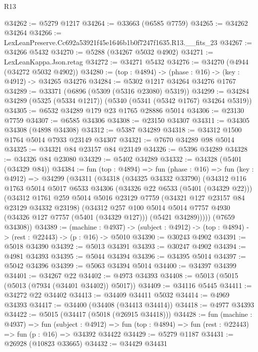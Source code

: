 \begin{lexlean}{R13}
\begin{coremodule}
@34262 := @5279 @1217
@34264 := @33663 (@6585 @7759)
@34265 := @34262 @34264
@34266 := LexLeanPreserve.Cc692a53921f45e1646b1b0f7247f1635.R13.__fits_23
@34267 := @34266 @5432
@34270 := @5288 (@34267 @5032 @4902)
@34271 := LexLeanKappa.Json.retag
@34272 := @34271 @5432
@34276 := @34270 (@4944 (@34272 @5032 @4902))
@34280 := (top : @4894) -> (phase : @16) -> (key : @4912) -> @34265 @34276
@34284 := @5302 @1217 @34264 @34276 @1767
@34289 := @33371 (@6896 (@5309 (@5316 @23080) @5319))
@34299 := @34284 @34289 (@5325 (@5334 @1217)) (@5340 (@5341 (@5342 @1767) @34264 @5319))
@34305 := @6532 @34289 @179 @23 @1765 @28886 @5014
@34306 := @23130 @7759
@34307 := @6585 @34306
@34308 := @23150 @34307
@34311 := @34305 @34308 (@4898 @34308)
@34312 := @5387 @34289
@34318 := @34312 @1500 @1764 @5014 @7933 @23149 @34307
@34321 := @7670 @34289 @98 @5014
@34325 := @34321 @84 @23157 @84 @23149
@34326 := @5396 @34289
@34328 := @34326 @84 @23080
@34329 := @5402 @34289
@34332 := @34328 (@5401 (@34329 @84))
@34384 := fun (top : @4894) =>
  fun (phase : @16) =>
  fun (key : @4912) =>
  @34299
    (@34311
      (@34318
        (@34325 @34332 @33790)
        (@34312
          @116
          @1763
          @5014
          @5017
          @6533
          @34306
          (@34326 @22 @6533 (@5401 (@34329 @22)))
          (@34312
            @1761
            @259
            @5014
            @5016
            @23129
            @7759
            (@34321 @127 @23157 @84 @23129 @34332 @23198)
            (@34312
              @257
              @100
              @5014
              @5014
              @7757
              @4930
              (@34326 @127 @7757 (@5401 (@34329 @127)))
              (@5421 @34289)))))
      (@7659 @34308))
@34389 := (machine : @4937) ->
  (subject : @4912) -> (top : @4894) -> (rest : @22443) -> (p : @16) -> @5010
@34390 := @30243 @4902
@34391 := @5018 @34390
@34392 := @5013 @34391
@34393 := @30247 @4902
@34394 := @4981 @34393
@34395 := @5044 @34394
@34396 := @34395 @5014
@34397 := @5042 @34396
@34399 := @5063 @34394 @5014
@34400 := @34397 @34399
@34401 := @34267 @22
@34402 := @4973 @34393
@34408 := @5013 (@5015 (@5013 (@7934 (@34401 @34402)) @5017))
@34409 := @34116 @5445
@34411 := @34272 @22 @34402
@34413 := @34409 @34411 @5032
@34414 := @4969 @34393
@34417 := @34400 (@34408 (@34413 @34414))
@34418 := @4977 @34393
@34422 := @5015 (@34417 (@5018 (@26915 @34418)))
@34428 := fun (machine : @4937) =>
  fun (subject : @4912) =>
  fun (top : @4894) => fun (rest : @22443) => fun (p : @16) => @34392 @34422
@34429 := @5279 @1187
@34431 := @26928 (@10823 @33665)
@34432 := @34429 @34431

\end{coremodule}
\end{lexlean}
